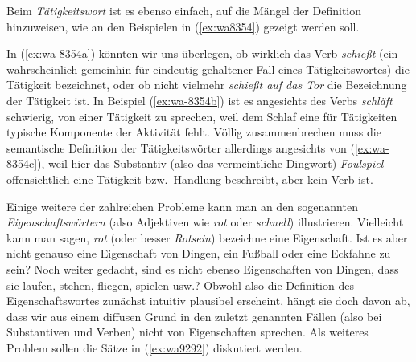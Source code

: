 Beim \textit{Tätigkeitswort} ist es ebenso einfach, auf die Mängel der Definition hinzuweisen, wie an den Beispielen in (\ref{ex:wa8354}) gezeigt werden soll.

\begin{exe}
  \ex\label{ex:wa8354}
  \begin{xlist}
  \end{xlist}
\end{exe}

In (\ref{ex:wa-8354a}) könnten wir uns überlegen, ob wirklich das Verb \textit{schießt} (ein wahrscheinlich gemeinhin für eindeutig gehaltener Fall eines Tätigkeitswortes) die Tätigkeit bezeichnet, oder ob nicht vielmehr \textit{schießt auf das Tor} die Bezeichnung der Tätigkeit ist.
In Beispiel (\ref{ex:wa-8354b}) ist es angesichts des Verbs \textit{schläft} schwierig, von einer Tätigkeit zu sprechen, weil dem Schlaf eine für Tätigkeiten typische Komponente der Aktivität fehlt.
Völlig zusammenbrechen muss die semantische Definition der Tätigkeitswörter allerdings angesichts von (\ref{ex:wa-8354c}), weil hier das Substantiv (also das vermeintliche Dingwort) \textit{Foulspiel} offensichtlich eine Tätigkeit bzw.\ Handlung beschreibt, aber kein Verb ist.

Einige weitere der zahlreichen Probleme kann man an den sogenannten \textit{Eigenschaftswörtern} (also Adjektiven wie \textit{rot} oder \textit{schnell}) illustrieren.
Vielleicht kann man sagen, \textit{rot} (oder besser \textit{Rotsein}) bezeichne eine Eigenschaft.
Ist es aber nicht genauso eine Eigenschaft von Dingen, ein Fußball oder eine Eckfahne zu sein?
Noch weiter gedacht, sind es nicht ebenso Eigenschaften von Dingen, dass sie laufen, stehen, fliegen, spielen usw.?
Obwohl also die Definition des Eigenschaftswortes zunächst intuitiv plausibel erscheint, hängt sie doch davon ab, dass wir aus einem diffusen Grund in den zuletzt genannten Fällen (also bei Substantiven und Verben) nicht von Eigenschaften sprechen.
Als weiteres Problem sollen die Sätze in (\ref{ex:wa9292}) diskutiert werden.

\begin{exe}
  \ex \label{ex:wa9292}
  \begin{xlist}
  \end{xlist}
\end{exe}

